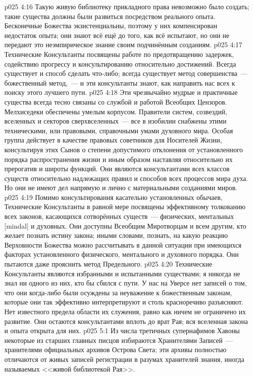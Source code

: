 \vs p025 4:16 Такую живую библиотеку прикладного права невозможно было создать; такие существа должны были развиться посредством реального опыта. Бесконечные Божества экзистенциальны, поэтому у них компенсирован недостаток опыта; они знают всё ещё до того, как всё испытают, но они не передают это неэмпирическое знание своим подчинённым созданиям.
\vs p025 4:17 \pc Технические Консультанты посвящены работе по предотвращению задержек, содействию прогрессу и консультированию относительно достижений. Всегда существует  и  способ сделать что\hyp{}либо; всегда существует метод совершенства~--- божественный метод,~--- и эти консультанты знают, как направить нас всех к поиску этого лучшего пути.
\vs p025 4:18 Эти чрезвычайно мудрые и практичные существа всегда тесно связаны со службой и работой Всеобщих Цензоров. Мелхиседеки обеспечены умелым корпусом. Правители систем, созвездий, вселенных и секторов сверхвселенных~--- все в изобилии снабжены этими техническими, или правовыми, справочными умами духовного мира. Особая группа действует в качестве правовых советников для Носителей Жизни, консультируя этих Сынов о степени допустимого отклонения от установленного порядка распространения жизни и иным образом наставляя относительно их прерогатив и широты функций. Они являются консультантами всех классов существ относительно надлежащих правил и способов всех процессов мира духа. Но они не имеют дел напрямую и лично с материальными созданиями миров.
\vs p025 4:19 Помимо консультирования касательно установленных обычаев, Технические Консультанты в равной мере посвящены эффективному толкованию всех законов, касающихся сотворённых существ~--- физических, ментальных [mindal] и духовных. Они доступны Всеобщим Миротворцам и всем другим, кто желает познать истину закона; иными словами, познать, на какую реакцию Верховности Божества можно рассчитывать в данной ситуации при имеющихся факторах установленного физического, ментального и духовного порядка. Они пытаются даже прояснить метод Предельного.
\vs p025 4:20 Технические Консультанты являются избранными и испытанными существами; я никогда не знал ни одного из них, кто бы сбился с пути. У нас на Уверсе нет записей о том, что они когда\hyp{}либо были осуждены за неуважение к божественным законам, которые они так эффективно интерпретируют и столь красноречиво разъясняют. Нет известного предела области их служения, равно как ничем не ограничено их развитие. Они остаются консультантами вплоть до врат Рая; вся вселенная закона и опыта открыта для них.
\vs p025 5:1 Из числа третичных супернафимов Хавоны некоторые из старших главных писцов избираются Хранителями Записей~--- хранителями официальных архивов Острова Света; эти архивы полностью отличаются от живых записей регистрации в разумах хранителей знания, иногда называемых <<живой библиотекой Рая>>.
